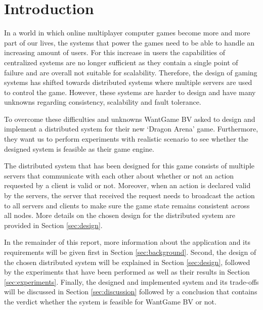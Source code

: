 \section{Introduction}
In a world in which online multiplayer computer games become more and more part of our lives, the systems that power the games need to be able to handle an increasing amount of users.
For this increase in users the capabilities of centralized systems are no longer sufficient as they contain a single point of failure and are overall not suitable for scalability.
Therefore, the design of gaming systems has shifted towards distributed systems where multiple servers are used to control the game.
However, these systems are harder to design and have many unknowns regarding consistency, scalability and fault tolerance.

To overcome these difficulties and unknowns WantGame BV asked to design and implement a distributed system for their new `Dragon Arena' game.
Furthermore, they want us to perform experiments with realistic scenario to see whether the designed system is feasible as their game engine.

The distributed system that has been designed for this game consists of multiple servers that communicate with each other about whether or not an action requested by a client is valid or not. 
Moreover, when an action is declared valid by the servers, the server that received the request needs to broadcast the action to all servers and clients to make sure the game state remains consistent across all nodes.
More details on the chosen design for the distributed system are provided in Section \ref{sec:design}.

In the remainder of this report, more information about the application and its requirements will be given first in Section \ref{sec:background}. 
Second, the design of the chosen distributed system will be explained in Section \ref{sec:design}, followed by the experiments that have been performed as well as their results in Section \ref{sec:experiments}.
Finally, the designed and implemented system and its trade-offs will be discussed in Section \ref{sec:discussion} followed by a conclusion that contains the verdict whether the system is feasible for WantGame BV or not.